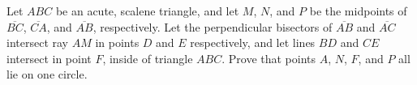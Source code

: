 Let $ ABC$ be an acute, scalene triangle, and let $ M$,  $ N$,  and $ P$ be the midpoints of $ \overline{BC}$,  $ \overline{CA}$,  and $ \overline{AB}$,  respectively. Let the perpendicular bisectors of $ \overline{AB}$ and $ \overline{AC}$ intersect ray $ AM$ in points $ D$ and $ E$ respectively, and let lines $ BD$ and $ CE$ intersect in point $ F$,  inside of triangle $ ABC$. Prove that points $ A$,  $ N$,  $ F$,  and $ P$ all lie on one circle.